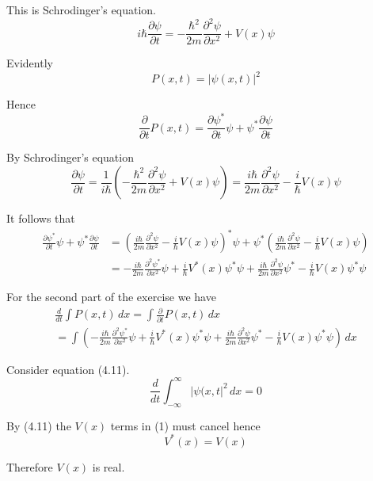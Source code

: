


This is Schrodinger's equation.
\begin{equation*}
i\hbar\frac{\partial\psi}{\partial t}
=-\frac{\hbar^2}{2m}\frac{\partial^2\psi}{\partial x^2}+V(x)\psi
\tag{4.1}
\end{equation*}

Evidently
\begin{equation*}
P(x,t)=|\psi(x,t)|^2
\end{equation*}

Hence
\begin{equation*}
\frac{\partial}{\partial t}P(x,t)
=\frac{\partial\psi^*}{\partial t}\psi
+\psi^*\frac{\partial\psi}{\partial t}
\end{equation*}

By Schrodinger's equation
\begin{equation*}
\frac{\partial\psi}{\partial t}
=\frac{1}{i\hbar}\left(
-\frac{\hbar^2}{2m}\frac{\partial^2\psi}{\partial x^2}+V(x)\psi
\right)
=\frac{i\hbar}{2m}\frac{\partial^2\psi}{\partial x^2}
-\frac{i}{\hbar}V(x)\psi
\end{equation*}

It follows that
\begin{align*}
\frac{\partial\psi^*}{\partial t}\psi
+\psi^*\frac{\partial\psi}{\partial t}
&=\left(\frac{i\hbar}{2m}\frac{\partial^2\psi}{\partial x^2}
-\frac{i}{\hbar}V(x)\psi\right)^*\psi
+\psi^*\left(\frac{i\hbar}{2m}\frac{\partial^2\psi}{\partial x^2}
-\frac{i}{\hbar}V(x)\psi\right)
\\
&=-\frac{i\hbar}{2m}\frac{\partial^2\psi^*}{\partial x^2}\psi
+\frac{i}{\hbar}V^*(x)\psi^*\psi
+\frac{i\hbar}{2m}\frac{\partial^2\psi}{\partial x^2}\psi^*
-\frac{i}{\hbar}V(x)\psi^*\psi
\end{align*}

For the second part of the exercise we have
\begin{multline*}
\frac{d}{dt}\int P(x,t)\,dx
=\int\frac{\partial}{\partial t}P(x,t)\,dx
\\
{}=\int
\left(
-\frac{i\hbar}{2m}\frac{\partial^2\psi^*}{\partial x^2}\psi
+\frac{i}{\hbar}V^*(x)\psi^*\psi
+\frac{i\hbar}{2m}\frac{\partial^2\psi}{\partial x^2}\psi^*
-\frac{i}{\hbar}V(x)\psi^*\psi
\right)\,dx\tag{1}
\end{multline*}

Consider equation (4.11).
\begin{equation*}
\frac{d}{dt}\int_{-\infty}^\infty|\psi(x,t|^2\,dx=0
\tag{4.11}
\end{equation*}

By (4.11) the $V(x)$ terms in (1) must cancel hence
\begin{equation*}
V^*(x)=V(x)
\end{equation*}

Therefore $V(x)$ is real.



